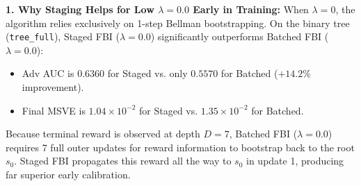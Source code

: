 \documentclass[11pt,a4paper]{article}
\begin{document}
\begin{table}[ht!]
\centering
\small
\renewcommand{\arraystretch}{1.2}
\caption{\textbf{Comparison of Four FBI Variants (Batched vs. Staged, $\lambda=0.0$ vs. $\lambda=0.8$).}}
\label{tab:fbi_four_variants}
\end{table}

\noindent\textbf{1. Why Staging Helps for Low $\lambda=0.0$ Early in Training:}
When $\lambda = 0$, the algorithm relies exclusively on 1-step Bellman bootstrapping. On the binary tree (\texttt{tree\_full}), Staged FBI ($\lambda=0.0$) significantly outperforms Batched FBI ($\lambda=0.0$):
\begin{itemize}[itemsep=1.5pt]
    \item Adv AUC is $\mathbf{0.6360}$ for Staged vs. only $\mathbf{0.5570}$ for Batched ($+14.2\%$ improvement).
    \item Final MSVE is $1.04\times 10^{-2}$ for Staged vs. $1.35\times 10^{-2}$ for Batched.
\end{itemize}
Because terminal reward is observed at depth $D=7$, Batched FBI ($\lambda=0.0$) requires 7 full outer updates for reward information to bootstrap back to the root $s_0$. Staged FBI propagates this reward all the way to $s_0$ in update 1, producing far superior early calibration.
\end{document}
